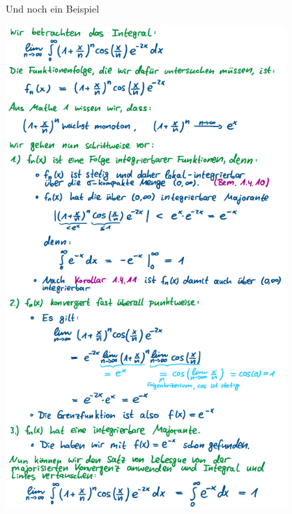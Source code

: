 \begin{Beispiel}{Und noch ein Beispiel}
    \begin{center}
    \includegraphics[width=0.80\textwidth]{Dateien/Beppo_Levi_Beispiel.png}
\end{center}
\end{Beispiel}
\newpage
